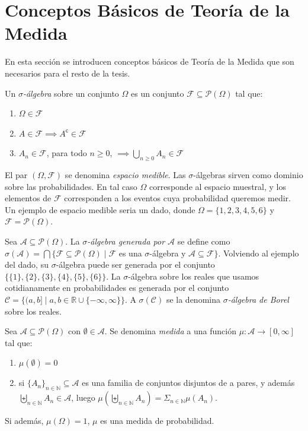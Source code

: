 \section{Conceptos Básicos de Teoría de la Medida}

En esta sección se introducen conceptos básicos de Teoría de la Medida que son necesarios para el resto de la tesis.

Un \emph{$\sigma$-álgebra} sobre un conjunto $\Omega$ es un conjunto $\mathcal{F} \subseteq \mathcal{P}(\Omega)$ tal que:
\begin{enumerate}
\item $\Omega \in \mathcal{F}$
\item $A \in \mathcal{F} \implies A^\mathsf{c} \in \mathcal{F}$
\item $A_n \in \mathcal{F}$, para todo $n \geq 0$, $ \implies \bigcup_{n \geq 0}A_n \in \mathcal{F}$
\end{enumerate}
El par $(\Omega,\mathcal{F})$ se denomina \emph{espacio medible}.
Las $\sigma$-álgebras sirven como dominio sobre las probabilidades. En tal caso $\Omega$ corresponde al espacio muestral, y los elementos de $\mathcal{F}$ corresponden a los eventos cuya probabilidad queremos medir. Un ejemplo de espacio medible seria un dado, donde $\Omega=\{1,2,3,4,5,6\}$ y $\mathcal{F}=\mathcal{P}(\Omega)$.

Sea $\mathcal{A} \subseteq \mathcal{P}(\Omega)$. La \emph{$\sigma$-álgebra generada por $\mathcal{A}$} se define como $\sigma(\mathcal{A}) = \bigcap\{\mathcal{F} \subseteq \mathcal{P}(\Omega) \mid \mathcal{F}$ es una $\sigma$-álgebra y $\mathcal{A} \subseteq \mathcal{F}\}$. Volviendo al ejemplo del dado, su $\sigma$-álgebra puede ser generada por el conjunto $\{\{1\},\{2\},\{3\},\{4\},\{5\},\{6\}\}$. La $\sigma$-álgebra sobre los reales que usamos cotidianamente en probabilidades es generada por el conjunto $\mathcal{C} = \{(a,b] \mid a,b \in \mathbb{R} \cup \{-\infty,\infty\}\}$. A $\sigma(\mathcal{C})$ se la denomina \textit{$\sigma$-álgebra de Borel} sobre los reales.

Sea $\mathcal{A} \subseteq \mathcal{P}(\Omega)$ con $\emptyset \in \mathcal{A}$. Se denomina \emph{medida} a una función $\mu:\mathcal{A} \rightarrow [0,\infty]$ tal que:
\begin{enumerate}
\item $\mu(\emptyset) = 0$
\item si $\{A_n\}_{n \in \mathbb{N}} \subseteq \mathcal{A}$ es una familia de conjuntos disjuntos de a pares, y además $\biguplus_{n \in \mathbb{N}} A_n \in \mathcal{A}$, luego $\mu(\biguplus_{n \in \mathbb{N}} A_n) = \Sigma_{n \in \mathbb{N}} \mu(A_n)$.
\end{enumerate}
Si además, $\mu(\Omega) = 1$, $\mu$ es una medida de probabilidad.

